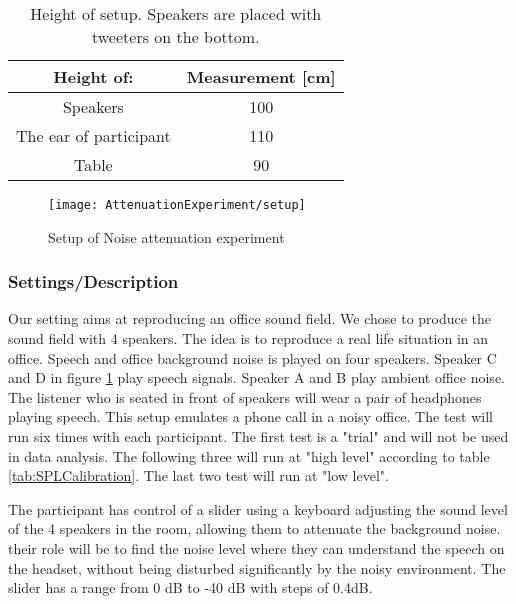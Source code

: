 \begin{table} [h]
	\centering
	\begin{tabular}{c c} \toprule
		\centering
		Height of:			 			& Measurement [cm] 	\\ \bottomrule
		Speakers					  	& 100				\\
		The ear of participant			& 110				\\ 
		Table							& 90				\\ \bottomrule 
	\end{tabular}
	\caption{Height of setup. Speakers are placed with tweeters on the bottom.}
	\label{Tab:NoiseAttenuationDimensions}
\end{table}

\begin{figure}[H]
	\centering
	\texttt{[image: AttenuationExperiment/setup]}
	\caption{Setup of Noise attenuation experiment}
	\label{Fig:NoiseAttenuationExperimet}
\end{figure}


\subsubsection{Settings/Description}
Our setting aims at reproducing an office sound field. We chose to produce the sound field with 4 speakers. 
The idea is to reproduce a real life situation in an office. Speech and office background noise is played on four speakers. Speaker C and D in figure \ref{Fig:NoiseAttenuationExperimet} play speech signals. Speaker A and B play ambient office noise. The listener who is seated in front of speakers will wear a pair of headphones playing speech. This setup emulates a phone call in a noisy office. The test will run six times with each participant. The first test is a "trial" and will not be used in data analysis. The following three will run at "high level" according to table \ref{tab:SPLCalibration}. The last two test will run at "low level". 

The participant has control of a slider using a keyboard adjusting the sound level of the 4 speakers in the room, allowing them to attenuate the background noise. their role will be to find the noise level where they can understand the speech on the headset, without being disturbed significantly by the noisy environment. The slider has a range from 0 dB to -40 dB with steps of 0.4dB. 


